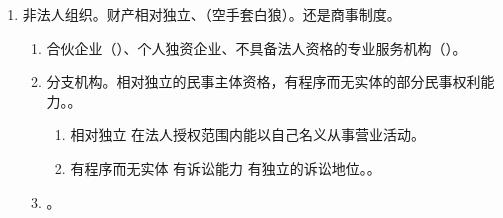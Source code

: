 \begin{enumerate}
\begin{enumerate}
\begin{enumerate}
                  \item 考。商事外观主义。
                \end{enumerate}
        \end{enumerate}
  \item 非法人组织。财产相对独立、（空手套白狼）。还是商事制度。
        \begin{enumerate}
          \item 合伙企业（）、个人独资企业、不具备法人资格的专业服务机构（）。
          \item 分支机构。相对独立的民事主体资格，有程序而无实体的部分民事权利能力。。
                \begin{enumerate}
                  \item 相对独立 \yjt 在法人授权范围内能以自己名义从事营业活动。
                  \item 有程序而无实体 \yjt 有诉讼能力 \yjt 有独立的诉讼地位。。
                \end{enumerate}
          \item {}。
        \end{enumerate}
\end{enumerate}
